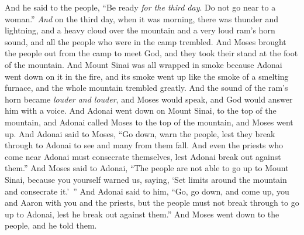 \begin{biblechapter}
\verse And he said to the people, “Be ready \textit{for the third day}. Do not go near to a woman.”
\verse \textit{And} on the third day, when it was morning, there was thunder and lightning, and a heavy cloud over the mountain and a very loud ram’s horn sound, and all the people who were in the camp trembled.
\verse And Moses brought the people out from the camp to meet God, and they took their stand at the foot of the mountain.
\verse And Mount Sinai was all wrapped in smoke because Adonai went down on it in the fire, and its smoke went up like the smoke of a smelting furnace, and the whole mountain trembled greatly.
\verse And the sound of the ram’s horn became \textit{louder and louder}, and Moses would speak, and God would answer him with a voice.
\verse And Adonai went down on Mount Sinai, to the top of the mountain, and Adonai called Moses to the top of the mountain, and Moses went up.
\verse And Adonai said to Moses, “Go down, warn the people, lest they break through to Adonai to see and many from them fall.
\verse And even the priests who come near Adonai must consecrate themselves, lest Adonai break out against them.”
\verse And Moses said to Adonai, “The people are not able to go up to Mount Sinai, because you yourself warned us, saying, ‘Set limits around the mountain and consecrate it.’ ”
\verse And Adonai said to him, “Go, go down, and come up, you and Aaron with you and the priests, but the people must not break through to go up to Adonai, lest he break out against them.”
\verse And Moses went down to the people, and he told them.
\end{biblechapter}

